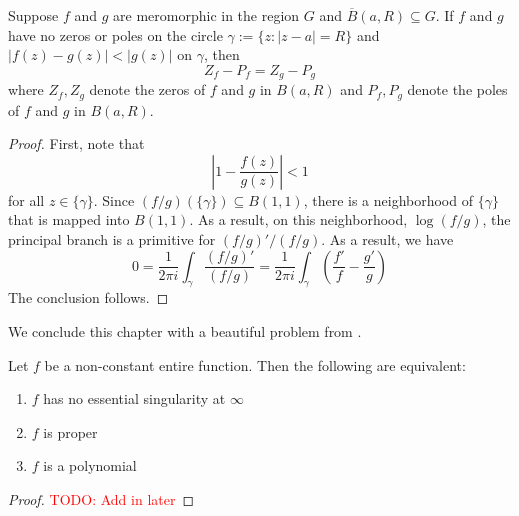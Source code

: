 \begin{theorem}[Rouch\'e]
    Suppose $f$ and $g$ are meromorphic in the region $G$ and $\overline B(a,R)\subseteq G$. If $f$ and $g$ have no zeros or poles on the circle $\gamma:= \{z: |z - a| = R\}$ and $|f(z) - g(z)| < |g(z)|$ on $\gamma$, then 
    \begin{equation*}
        Z_f - P_f = Z_g - P_g
    \end{equation*}
    where $Z_f,Z_g$ denote the zeros of $f$ and $g$ in $B(a,R)$ and $P_f,P_g$ denote the poles of $f$ and $g$ in $B(a,R)$.
\end{theorem}
\begin{proof}
    First, note that 
    \begin{equation*}
        \left|1 - \frac{f(z)}{g(z)}\right| < 1
    \end{equation*}
    for all $z\in\{\gamma\}$. Since $(f/g)(\{\gamma\})\subseteq B(1,1)$, there is a neighborhood of $\{\gamma\}$ that is mapped into $B(1,1)$. As a result, on this neighborhood, $\log(f/g)$, the principal branch is a primitive for $(f/g)'/(f/g)$. As a result, we have 
    \begin{equation*}
        0 = \frac{1}{2\pi i}\int_\gamma\frac{(f/g)'}{(f/g)} = \frac{1}{2\pi i}\int_\gamma\left(\frac{f'}{f} - \frac{g'}{g}\right)
    \end{equation*}
    The conclusion follows.
\end{proof}

We conclude this chapter with a beautiful problem from \cite{ahlfors}.

\begin{theorem}
Let $f$ be a non-constant entire function. Then the following are equivalent: 
\begin{enumerate}[label=(\alph*)]
\item $f$ has no essential singularity at $\infty$ 
\item $f$ is proper 
\item $f$ is a polynomial
\end{enumerate}
\end{theorem}
\begin{proof}
    \textcolor{red}{TODO: Add in later}
\end{proof}